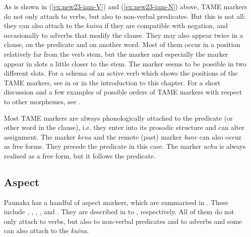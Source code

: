 As is shown in (\ref{ex:new23-iam-V}) and (\ref{ex:new23-iam-N}) above, TAME markers do not only attach to verbs, but also to non-verbal predicates. But this is not all: they can also attach to the  \textit{kuina} if they are compatible with negation, and occasionally to adverbs that modify the clause. They may also appear twice in a clause, on the predicate and on another word. Most of them occur in a position relatively far from the verb stem, but the  marker and especially the  marker appear in slots a little closer to the stem. The  marker seems to be possible in two different slots. For a schema of an active verb which shows the positions of the TAME markers, see  in  or  in the introduction to this chapter. For a short discussion and a few examples of possible orders of TAME markers with respect to other morphemes, see .

Most TAME markers are always phonologically attached to the predicate (or other word in the clause), i.e. they enter into its prosodic structure and can alter  assignment. The  marker \textit{kena} and the remote (past) marker \textit{bane} can also occur as free forms. They precede the predicate in this case. The  marker \textit{uchu} is always realised as a free form, but it follows the predicate.


\subsection{Aspect}\label{sec:AspectTense}
\largerpage
Paunaka has a handful of aspect markers, which are summarised in . These include , , , , and . They are described in  to , respectively. All of them do not only attach to verbs, but also to non-verbal predicates and to adverbs and some can also attach to the  \textit{kuina}.



